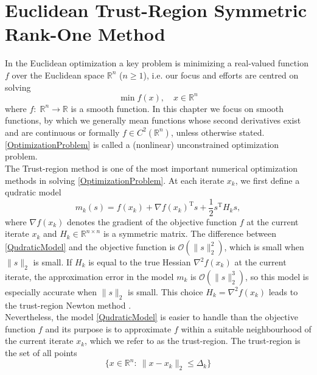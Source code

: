\chapter{Euclidean Trust-Region Symmetric Rank-One Method}

In the Euclidean optimization a key problem is minimizing a real-valued function $f$ over the Euclidean space $\mathbb{R}^n$ ($n \geq 1$), i.e. our focus and efforts are centred on solving 
\begin{equation}\label{OptimizationProblem}
    \min f(x), \quad x \in \mathbb{R}^n
\end{equation}  
where $f \colon \; \mathbb{R}^n \to \mathbb{R}$ is a smooth function. In this chapter we focus on smooth functions, by which we generally mean functions whose second derivatives exist and are continuous or formally $f \in C^2(\mathbb{R}^n)$, unless otherwise stated. \cref{OptimizationProblem} is called a (nonlinear) unconstrained optimization problem. \\
The Trust-region method is one of the most important numerical optimization methods in solving \cref{OptimizationProblem}. At each iterate $x_k$, we first define a qudratic model 
\begin{equation}\label{QudraticModel}
    m_k(s) = f(x_k) + \nabla f(x_k)^{\mathrm{T}} s + \frac{1}{2} s^{\mathrm{T}} H_k s,
\end{equation}
where $\nabla f(x_k)$ denotes the gradient of the objective function $f$ at the current iterate $x_k$ and $H_k \in  \mathbb{R}^{n \times n}$ is a symmetric matrix. The difference between \cref{QudraticModel} and the objective function is $\mathcal{O}(\lVert s \rVert^{2}_2)$, which is small when $\lVert s \rVert_2$ is small. If $H_k$ is equal to the true Hessian $\nabla^2 f(x_k)$ at the current iterate, the approximation error in the model $m_k$ is $\mathcal{O}(\lVert s \rVert^{3}_2)$, so this model is especially accurate when $\lVert s \rVert_2$ is small. This choice $H_k = \nabla^2 f(x_k)$ leads to the trust-region Newton method \cite[p.~68]{NocedalWright:2006}. \\
Nevertheless, the model \cref{QudraticModel} is easier to handle than the objective function $f$ and its purpose is to approximate $f$ within a suitable neighbourhood of the current iterate $x_k$, which we refer to as the trust-region. The trust-region is the set of all points
\begin{equation}\label{TrustRegion}
    \{ x \in \mathbb{R}^n \colon \ \lVert x - x_k \rVert_2 \leq \Delta_k \}
\end{equation}

